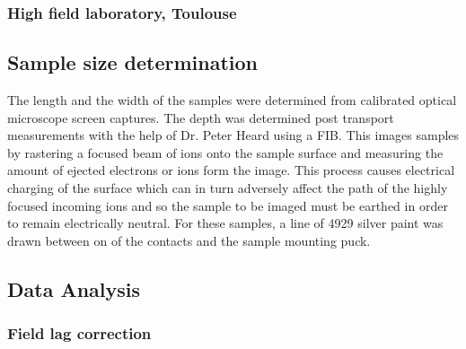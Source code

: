 \subsubsection{High field laboratory, Toulouse}


\subsection{Sample size determination}

The length and the width of the samples were determined from calibrated optical microscope screen captures. The depth was determined post transport measurements with the help of Dr. Peter Heard using a \ac{FIB}. This images samples by rastering a focused beam of ions onto the sample surface and measuring the amount of ejected electrons or ions form the image. This process causes electrical charging of the surface which can in turn adversely affect the path of the highly focused incoming ions and so the sample to be imaged must be earthed in order to remain electrically neutral. For these samples, a line of 4929 silver paint was drawn between on of the contacts and the sample mounting puck.

\subsection{Data Analysis}

\subsubsection{Field lag correction}



